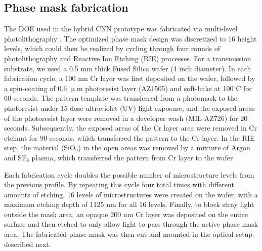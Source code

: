 \documentclass[fleqn,10pt]{wlscirep}
\begin{document}
\subsection*{Phase mask fabrication}
The DOE used in the hybrid CNN prototype was fabricated via multi-level photolithography \cite{peng2016diffractive}. The optimized phase mask design was discretized to 16 height levels, which could then be realized by cycling through four rounds of photolithography and Reactive Ion Etching (RIE) processes. For a transmission substrate, we used a 0.5 mm thick Fused Silica wafer (4 inch diameter). In each fabrication cycle, a 100 nm Cr layer was first deposited on the wafer, followed by a spin-coating of 0.6 $\upmu$m photoresist layer (AZ1505) and soft-bake at 100$^{\circ}$C for 60 seconds. The pattern template was transferred from a photomask to the photoresist under 15 dose ultraviolet (UV) light exposure, and the exposed areas of the photoresist layer were removed in a developer wash (MIL AZ726) for 20 seconds. Subsequently, the exposed areas of the Cr layer area were removed in Cr etchant for 90 seconds, which transferred the pattern to the Cr layer. In the RIE step, the material (SiO$_2$) in the open areas was removed by a mixture of Argon and SF$_6$ plasma, which transferred the pattern from Cr layer to the wafer. 

Each fabrication cycle doubles the possible number of microstructure levels from the previous profile. By repeating this cycle four total times with different amounts of etching, 16 levels of microstructures were created on the wafer, with a maximum etching depth of 1125 nm for all 16 levels. Finally, to block stray light outside the mask area, an opaque 200 nm Cr layer was deposited on the entire surface and then etched to only allow light to pass through the active phase mask area. The fabricated phase mask was then cut and mounted in the optical setup described next.
\end{document}
